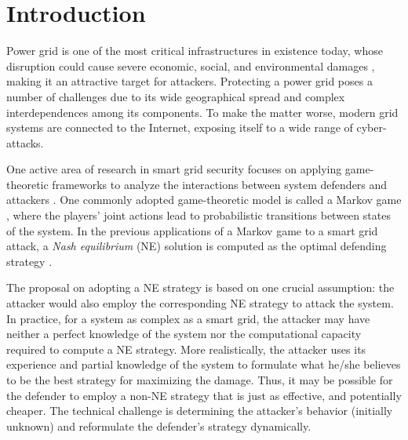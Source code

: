 \section{Introduction}

Power grid is one of the most critical infrastructures in existence today, whose disruption could cause severe economic, social, and environmental damages \cite{brown2006defending,salmeron2004analysis}, making it an attractive target for attackers. Protecting a power grid poses a number of challenges due to its wide geographical spread and complex interdependences among its components. To make the matter worse, modern grid systems are connected to the Internet, exposing itself to a wide range of cyber-attacks.

One active area of research in smart grid security focuses on applying game-theoretic frameworks to analyze the interactions between system defenders and attackers \cite{saad2012game}. One commonly adopted game-theoretic model is called a Markov game \cite{minmaxQ}, where the players' joint actions lead to probabilistic transitions between states of the system. In the previous applications of a Markov game to a smart grid attack, a \textit{Nash equilibrium} (NE) solution is computed as the optimal defending strategy \cite{law2012security,ma2013markov}. 

The proposal on adopting a NE strategy is based on one crucial assumption: the attacker would also employ the corresponding NE strategy to attack the system. In practice, for a system as complex as a smart grid, the attacker may have neither a perfect knowledge of the system nor the computational capacity required to compute a NE strategy. More realistically, the attacker uses its experience and partial knowledge of the system to formulate what he/she believes to be the best strategy for maximizing the damage. Thus, it may be possible for the defender to employ a non-NE strategy that is just as effective, and potentially cheaper. The technical challenge is determining the attacker's behavior (initially unknown) and reformulate the defender's strategy dynamically.


